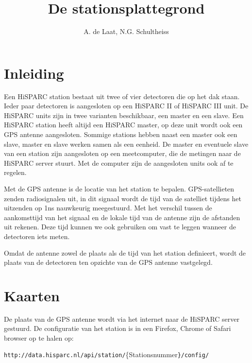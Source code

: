 



\title{De stationsplattegrond}


\author{A. de Laat, N.G. Schultheiss}

\maketitle

\section{Inleiding}

Een HiSPARC station bestaat uit twee of vier detectoren die op het dak staan. Ieder paar detectoren is aangesloten op een HiSPARC II of HiSPARC III unit. De HiSPARC units zijn in twee varianten beschikbaar, een master en een slave. Een HiSPARC station heeft altijd een HiSPARC
master, op deze unit wordt ook een GPS antenne aangesloten. Sommige stations hebben naast een master ook een slave, master en slave werken
samen als een eenheid. De master en eventuele slave van een station zijn aangesloten op een meetcomputer, die de metingen naar de HiSPARC
server stuurt. Met de computer zijn de aangesloten units ook af te regelen.

Met de GPS antenne is de locatie van het station te bepalen. GPS-satellieten zenden radiosignalen uit, in dit signaal wordt de tijd van de satelliet
tijdens het uitzenden op 1ns nauwkeurig meegestuurd. Met het verschil tussen de aankomsttijd van het signaal en de lokale tijd van de antenne
zijn de afstanden uit rekenen. Deze tijd kunnen we ook gebruiken om  vast te leggen wanneer de detectoren iets meten. 

Omdat de antenne zowel de plaats als de tijd van het station definieert, wordt de plaats van de detectoren ten opzichte van de GPS antenne vastgelegd.


\section{Kaarten}

De plaats van de GPS antenne wordt via het internet naar de HiSPARC server gestuurd. De configuratie van het station is in een Firefox,
Chrome of Safari browser op te halen op: 

\texttt{\small{http://data.hisparc.nl/api/station/}}{\small{\{Stationsnummer}}\texttt{\small{\}/config/}}{\small \par}

